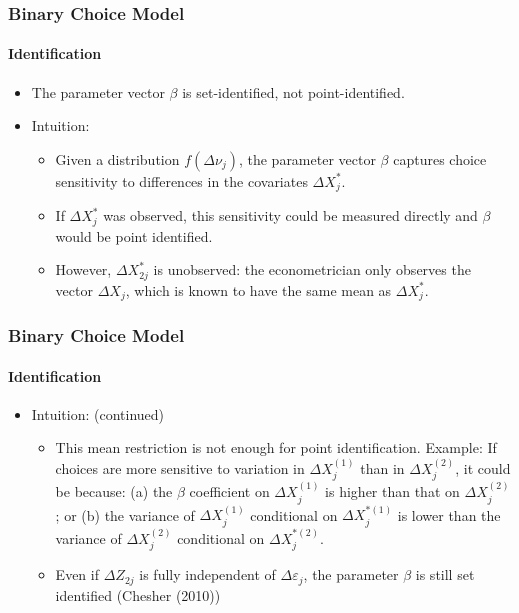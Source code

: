 \documentclass[notes=show]{beamer}
\begin{document}
\begin{frame}
\frametitle{Binary Choice Model}
\framesubtitle{Identification}

\begin{itemize}
	\item The parameter vector $\beta$ is set-identified, not point-identified.
	\item Intuition:
	\begin{itemize}
		\item Given a distribution $f(\Delta\nu_{j})$, the parameter vector $\beta$ captures choice sensitivity to differences in the covariates $\Delta X^{*}_{j}$.
		\item If $\Delta X^{*}_{j}$ was observed, this sensitivity could be measured directly and $\beta$ would be point identified.
		\item However, $\Delta X^{*}_{2j}$ is unobserved: the econometrician only observes the vector $\Delta X_{j}$, which is known to have the same mean as $\Delta X^{*}_{j}$.
	\end{itemize}
\end{itemize}
\end{frame}

\begin{frame}
\frametitle{Binary Choice Model}
\framesubtitle{Identification}

\begin{itemize}
	\item Intuition: (continued)
	\begin{itemize}
		\item This mean restriction is not enough for point identification. Example: If choices are more sensitive to variation in $\Delta X^{(1)}_{j}$ than in $\Delta X^{(2)}_{j}$, it could be because: (a) the $\beta$ coefficient on $\Delta X^{(1)}_{j}$ is higher than that on $\Delta X^{(2)}_{j}$; or (b) the variance of $\Delta X^{(1)}_{j}$ conditional on $\Delta X^{*(1)}_{j}$ is lower than the variance of $\Delta X^{(2)}_{j}$ conditional on $\Delta X^{*(2)}_{j}$.
		\item Even if $\Delta Z_{2j}$ is fully independent of $\Delta\varepsilon_{j}$, the parameter $\beta$ is still set identified (Chesher (2010))
	\end{itemize}
\end{itemize}
\end{frame}
\end{document}
